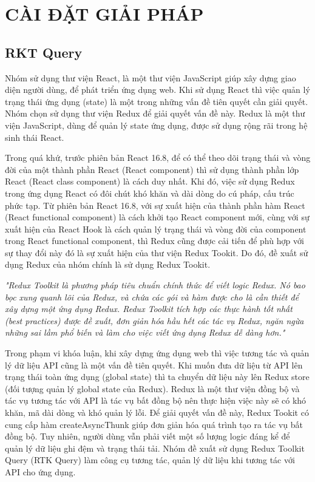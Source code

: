 \chapter{CÀI ĐẶT GIẢI PHÁP}

\section{RKT Query} \label{sec:RTKQ}

\tab Nhóm sử dụng thư viện React, là một thư viện JavaScript giúp xây dựng giao diện người dùng, để phát triển ứng dụng web.
Khi sử dụng React thì việc quản lý trạng thái ứng dụng (state) là một trong những vấn đề tiên quyết cần giải quyết.
Nhóm chọn sử dụng thư viện Redux để giải quyết vấn đề này.
Redux là một thư viện JavaScript, dùng để quản lý state ứng dụng, được sử dụng rộng rãi trong hệ sinh thái React.
\par

Trong quá khứ, trước phiên bản React 16.8, để có thể theo dõi trạng thái và vòng đời của một thành phần React (React component) thì sử dụng thành phần lớp React (React class component) là cách duy nhất.
Khi đó, việc sử dụng Redux trong ứng dụng React có đôi chút khó khăn và dài dòng do cú pháp, cấu trúc phức tạp.
Từ phiên bản React 16.8, với sự xuất hiện của thành phần hàm React (React functional component) là cách khởi tạo React component mới, cùng với sự xuất hiện của React Hook là cách quản lý trạng thái và vòng đời của component trong React functional component, thì Redux cũng được cải tiến để phù hợp với sự thay đổi này đó là sự xuất hiện của thư viện Redux Tookit.
Do đó, đề xuất sử dụng Redux của nhóm chính là sử dụng Redux Tookit.
\par

\textit{"Redux Toolkit là phương pháp tiêu chuẩn chính thức để viết logic Redux.
  Nó bao bọc xung quanh lõi của Redux, và chứa các gói và hàm được cho là cần thiết để xây dựng một ứng dụng Redux.
  Redux Toolkit tích hợp các thực hành tốt nhất (best practices) được đề xuất, đơn giản hóa hầu hết các tác vụ Redux, ngăn ngừa những sai lầm phổ biến và làm cho việc viết ứng dụng Redux dễ dàng hơn."} \cite{chap4bib1}
\par

Trong phạm vi khóa luận, khi xây dựng ứng dụng web thì việc tương tác và quản lý dữ liệu API cũng là một vấn đề tiên quyết.
Khi muốn đưa dữ liệu từ API lên trạng thái toàn ứng dụng (global state) thì ta chuyển dữ liệu này lên Redux store (đối tượng quản lý global state của Redux).
Redux là một thư viện đồng bộ và tác vụ tương tác với API là tác vụ bất đồng bộ nên thực hiện việc này sẽ có khó khăn, mã dài dòng và khó quản lý lỗi.
Để giải quyết vấn đề này, Redux Tookit có cung cấp hàm createAsyncThunk giúp đơn giản hóa quá trình tạo ra tác vụ bất đồng bộ.
Tuy nhiên, người dùng vẫn phải viết một số lượng logic đáng kể để quản lý dữ liệu ghi đệm và trạng thái tải.
Nhóm đề xuất sử dụng Redux Toolkit Query (RTK Query) làm công cụ tương tác, quản lý dữ liệu khi tương tác với API cho ứng dụng.
\par

